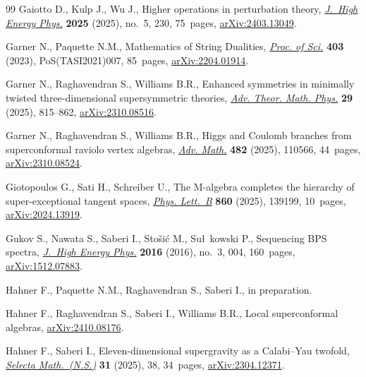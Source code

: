 \documentclass[pdftex]{sigma}
\numberwithin{equation}{section}
\theoremstyle{definition}
\begin{document}
\begin{thebibliography}{99}
Gaiotto D., Kulp J., Wu J., Higher operations in perturbation theory,
 \href{https://doi.org/10.1007/jhep05(2025)230}{\textit{J.~High Energy Phys.}}
 \textbf{2025} (2025), no.~5, 230, 75~pages,
 \href{http://arxiv.org/abs/2403.13049}{arXiv:2403.13049}.

Garner N., Paquette N.M., Mathematics of String Dualities,
 \href{https://doi.org/10.22323/1.403.0007}{\textit{Proc. of Sci.}}
 \textbf{403} (2023), PoS(TASI2021)007, 85~pages,
 \href{http://arxiv.org/abs/2204.01914}{arXiv:2204.01914}.

Garner N., Raghavendran S., Williams B.R., Enhanced symmetries in minimally
 twisted three-dimensional supersymmetric theories,
 \href{https://doi.org/10.4310/atmp.250929221027}{\textit{Adv. Theor. Math.
 Phys.}} \textbf{29} (2025), 815--862,
 \href{http://arxiv.org/abs/2310.08516}{arXiv:2310.08516}.

Garner N., Raghavendran S., Williams B.R., Higgs and {C}oulomb branches from
 superconformal raviolo vertex algebras,
 \href{https://doi.org/10.1016/j.aim.2025.110566}{\textit{Adv. Math.}}
 \textbf{482} (2025), 110566, 44~pages,
 \href{http://arxiv.org/abs/2310.08524}{arXiv:2310.08524}.

Giotopoulos G., Sati H., Schreiber U., The {M}-algebra completes the hierarchy
 of super-exceptional tangent spaces,
 \href{https://doi.org/10.1016/j.physletb.2024.139199}{\textit{Phys. Lett.~B}}
 \textbf{860} (2025), 139199, 10~pages,
 \href{http://arxiv.org/abs/2024.13919}{arXiv:2024.13919}.

Gukov S., Nawata S., Saberi I., Sto\v{s}i\'c M., Su\l~kowski P., Sequencing
 {BPS} spectra, \href{https://doi.org/10.1007/JHEP03(2016)004}{\textit{J.~High
 Energy Phys.}} \textbf{2016} (2016), no.~3, 004, 160~pages,
 \href{http://arxiv.org/abs/1512.07883}{arXiv:1512.07883}.

Hahner F., Paquette N.M., Raghavendran S., Saberi I., {i}n
 preparation.

Hahner F., Raghavendran S., Saberi I., Williams B.R., Local superconformal
 algebras, \href{http://arxiv.org/abs/2410.08176}{arXiv:2410.08176}.

Hahner F., Saberi I., Eleven-dimensional supergravity as a {C}alabi--{Y}au
 twofold, \href{https://doi.org/10.1007/s00029-025-01024-x}{\textit{Selecta
 Math.~(N.S.)}} \textbf{31} (2025), 38, 34~pages,
 \href{http://arxiv.org/abs/2304.12371}{arXiv:2304.12371}.


\end{thebibliography}
\end{document}
